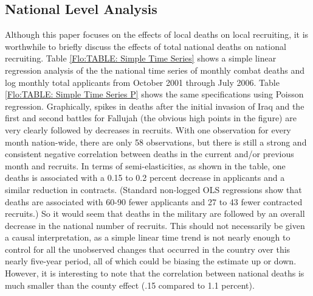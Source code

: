 \documentclass[12pt] {article}
\begin{document}
\subsection{National Level Analysis}
Although this paper focuses on the effects of local deaths on local
recruiting, it is worthwhile to briefly discuss the effects of total national
deaths on national recruiting. Table \ref{Flo:TABLE: Simple Time Series}
shows a simple linear regression analysis of the the national time series of monthly combat deaths and log monthly total applicants from October 2001 through July 2006. Table \ref{Flo:TABLE: Simple Time Series P} shows the same specifications using Poisson regression. Graphically, spikes in deaths after the initial invasion of Iraq and the first
and second battles for Fallujah (the obvious high points in the figure)
are very clearly followed by decreases in recruits. With one observation
for every month nation-wide, there are only 58 observations, but there
is still a strong and consistent negative correlation between deaths
in the current and/or previous month and recruits. In terms of semi-elasticities,
as shown in the table, one deaths is associated with a 0.15 to 0.2 percent decrease in applicants and a similar reduction in contracts. (Standard non-logged OLS regressions show
that deaths are associated with 60-90 fewer applicants and 27 to 43
fewer contracted recruits.) So it would seem that deaths in the military
are followed by an overall decrease in the national number of recruits.
This should not necessarily be given a causal interpretation, as a
simple linear time trend is not nearly enough to control for all the
unobserved changes that occurred in the country over this nearly five-year
period, all of which could be biasing the estimate up or down. However, it is interesting to note that the correlation between national deaths is much smaller than the county effect (.15 compared to 1.1 percent). 

\end{document}
